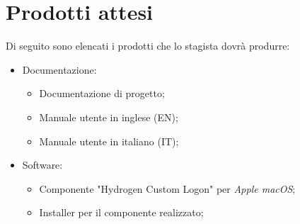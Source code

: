 \section*{Prodotti attesi}
Di seguito sono elencati i prodotti che lo stagista dovrà produrre:
\begin{itemize}
	\item Documentazione:
	\begin{itemize}
		\item Documentazione di progetto;
		\item Manuale utente in inglese (EN);
		\item Manuale utente in italiano (IT);
	\end{itemize}
	\item Software:
	\begin{itemize}
		\item Componente "Hydrogen Custom Logon" per \textit{Apple macOS};
		\item Installer per il componente realizzato;
	\end{itemize}
\end{itemize}

%
%    
%    

